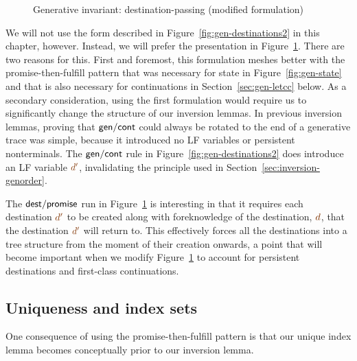 \begin{figure}[tp]
\caption{Generative invariant: destination-passing (modified formulation)}
\label{fig:gen-destinations} 
\end{figure}

We will not use the form described in
Figure~\ref{fig:gen-destinations2} in this chapter, however. Instead,
we will prefer the presentation in Figure~\ref{fig:gen-destinations}.
There are two reasons for this. First and foremost, this formulation
meshes better with the promise-then-fulfill pattern that was necessary
for state in Figure~\ref{fig:gen-state} and that is also necessary for
continuations in Section~\ref{sec:gen-letcc} below. As a secondary
consideration, using the first formulation would require us to 
significantly change the structure of our inversion lemmas.
In previous inversion lemmas, proving
that ${\sf gen/cont}$ could always be rotated to the end of a
generative trace was simple, because it introduced no LF variables or
persistent nonterminals. The ${\sf gen/cont}$ rule in
Figure~\ref{fig:gen-destinations2} does introduce an LF variable
$\lf{d'}$, invalidating the principle used in
Section~\ref{sec:inversion-genorder}.

The ${\sf dest/promise}$ run in Figure~\ref{fig:gen-destinations} is
interesting in that it requires each destination $\lf{d'}$ to be
created along with foreknowledge of the destination, $\lf{d}$, that
the destination $\lf{d'}$ will return to. This effectively forces
all the destinations into a tree structure from the moment of their
creation onwards, a point that will become important when we modify
Figure~\ref{fig:gen-destinations} to account for persistent
destinations and first-class continuations.

\subsection{Uniqueness and index sets}
\label{sec:uniqueness-gendests}

One consequence of using the promise-then-fulfill pattern is that our
unique index lemma becomes conceptually prior to our inversion lemma.

